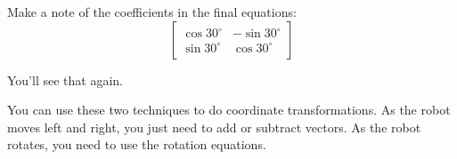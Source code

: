 \documentclass{article}
\begin{document}
Make a note of the coefficients in the final equations:
\[
    \begin{bmatrix}
        \cos 30^\circ & -\sin 30^\circ\\
        \sin 30^\circ & \cos 30^\circ
    \end{bmatrix}
\]

You'll see that again.

You can use these two techniques to do coordinate transformations. 
As the robot moves left and right, you just need to add or subtract vectors.
As the robot rotates, you need to use the rotation equations.
\end{document}
